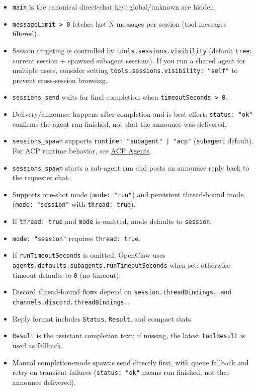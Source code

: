 \begin{itemize}
  \item \texttt{main} is the canonical direct-chat key; global/unknown are hidden.
  \item \texttt{messageLimit > 0} fetches last N messages per session (tool messages filtered).
  \item Session targeting is controlled by \texttt{tools.sessions.visibility} (default \texttt{tree}: current session + spawned subagent sessions). If you run a shared agent for multiple users, consider setting \texttt{tools.sessions.visibility: "self"} to prevent cross-session browsing.
  \item \texttt{sessions\_send} waits for final completion when \texttt{timeoutSeconds > 0}.
  \item Delivery/announce happens after completion and is best-effort; \texttt{status: "ok"} confirms the agent run finished, not that the announce was delivered.
  \item \texttt{sessions\_spawn} supports \texttt{runtime: "subagent" | "acp"} (\texttt{subagent} default). For ACP runtime behavior, see \href{/tools/acp-agents}{ACP Agents}.
  \item \texttt{sessions\_spawn} starts a sub-agent run and posts an announce reply back to the requester chat.
  \item Supports one-shot mode (\texttt{mode: "run"}) and persistent thread-bound mode (\texttt{mode: "session"} with \texttt{thread: true}).
  \item If \texttt{thread: true} and \texttt{mode} is omitted, mode defaults to \texttt{session}.
  \item \texttt{mode: "session"} requires \texttt{thread: true}.
  \item If \texttt{runTimeoutSeconds} is omitted, OpenClaw uses \texttt{agents.defaults.subagents.runTimeoutSeconds} when set; otherwise timeout defaults to \texttt{0} (no timeout).
  \item Discord thread-bound flows depend on \texttt{session.threadBindings.\textit{} and \texttt{channels.discord.threadBindings.}}.
  \item Reply format includes \texttt{Status}, \texttt{Result}, and compact stats.
  \item \texttt{Result} is the assistant completion text; if missing, the latest \texttt{toolResult} is used as fallback.
  \item Manual completion-mode spawns send directly first, with queue fallback and retry on transient failures (\texttt{status: "ok"} means run finished, not that announce delivered).

\end{itemize}
